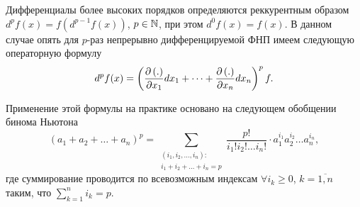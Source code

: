 \documentclass[../../main.tex]{subfiles}
\begin{document}
	Дифференциалы более высоких порядков определяются реккурентным образом 
	$d^pf(x) = f\left(d^{p - 1}f(x)\right)$, $p\in\mathbb{N}$, при этом 
	$d^0f(x) = f(x)$. В данном случае опять для $p$-раз непрерывно 
	дифференцируемой ФНП имеем следующую операторную формулу
	\begin{equation}
		d^pf(x) = \left(\frac{\partial \left(.\right)}{\partial x_1}dx_1 + \dots + 
		\frac{\partial \left(.\right)}{\partial x_n}dx_n\right)^p f.
		\label{24:diff}
	\end{equation}
	
	Применение этой формулы на практике основано на следующем обобщении бинома 
	Ньютона
	\[\left(a_1 + a_2 + \dots + a_n\right)^p = \sum_{
		\substack{
			\left(i_1, i_2, \dots, i_n\right):\\
			i_1 + i_2 + \dots + i_n = p
	}}\frac{p!}{i_1!i_2!\dots i_n!}\cdot a_1^{i_1}a_2^{i_2}\dots a_n^{i_n},\]
	где суммирование проводится по всевозможным индексам $\forall i_k\ge 0$, 
	$k = \overline{1, n}$ таким, что $\sum_{k = 1}^ni_k = p$.
\end{document}
